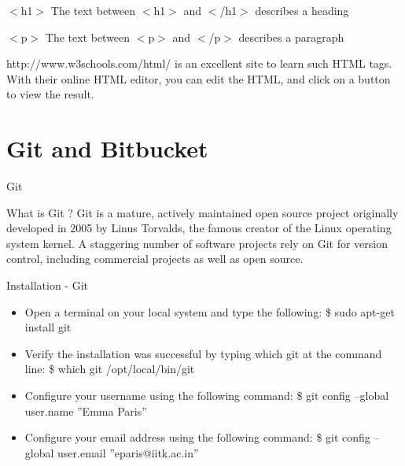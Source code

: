 \documentclass[pdf]{beamer}
\begin{document}
\begin{frame}
\begin{block}{$<$h1$>$}
The text between $<$h1$>$ and $<$/h1$>$ describes a heading
\end{block}

\begin{block}{$<$p$>$}
The text between $<$p$>$ and $<$/p$>$ describes a paragraph
\end{block}

\begin{block}{}
http://www.w3schools.com/html/ is an excellent site to learn such HTML tags. With their online HTML editor, you can edit the HTML, and click on a button to view the result.
\end{block}

\end{frame}

\section{Git and Bitbucket}

\begin{frame}{Git}
	\begin{block}{What is Git ?}
	Git is a mature, actively maintained open source project originally developed in 2005 by Linus Torvalds, the famous creator of the Linux operating system kernel. A staggering number of software projects rely on Git for version control, including commercial projects as well as open source.
	\end{block}
\end{frame}

\begin{frame}
\begin{block}{Installation - Git}
\begin{itemize}
\item Open a terminal on your local system and type the following: \$ sudo apt-get install git \\
\item Verify the installation was successful by typing which git at the command line: \$ which git /opt/local/bin/git \\
\item Configure your username using the following command: \$ git config –global user.name
”Emma Paris” \\
\item Configure your email address using the following command: \$ git config –global user.email ”eparis@iitk.ac.in”
\end{itemize}
\end{block}
\end{frame}
\end{document}
